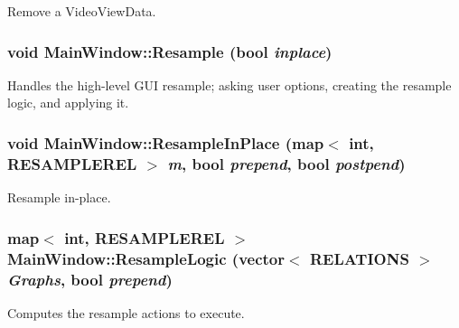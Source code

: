 Remove a VideoViewData. 

\hypertarget{class_main_window_956544786652cdf874a92139068e8bf3}{
\subsubsection[{Resample}]{\setlength{\rightskip}{0pt plus 5cm}void MainWindow::Resample (bool {\em inplace})}}
\label{class_main_window_956544786652cdf874a92139068e8bf3}


Handles the high-level GUI resample; asking user options, creating the resample logic, and applying it. 

\hypertarget{class_main_window_5b0b81d08ca239215d465b35a74236a7}{
\subsubsection[{ResampleInPlace}]{\setlength{\rightskip}{0pt plus 5cm}void MainWindow::ResampleInPlace (map$<$ int, {\bf RESAMPLEREL} $>$ {\em m}, \/  bool {\em prepend}, \/  bool {\em postpend})}}
\label{class_main_window_5b0b81d08ca239215d465b35a74236a7}


Resample in-place. 

\hypertarget{class_main_window_11acf5df9e30701c181eef07283e7e9a}{
\subsubsection[{ResampleLogic}]{\setlength{\rightskip}{0pt plus 5cm}map$<$ int, {\bf RESAMPLEREL} $>$ MainWindow::ResampleLogic (vector$<$ {\bf RELATIONS} $>$ {\em Graphs}, \/  bool {\em prepend})}}
\label{class_main_window_11acf5df9e30701c181eef07283e7e9a}


Computes the resample actions to execute. 

